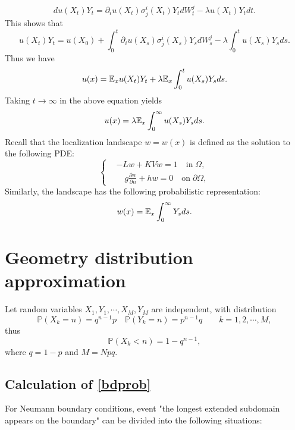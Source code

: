 \documentclass[a4paper,11pt]{article}
\begin{document}
\begin{appendices}
\begin{equation*}
du(X_t) Y_t = \partial_i u(X_t) \sigma^i_j(X_t) Y_t dW^j_t - \lambda u(X_t) Y_tdt.
\end{equation*}
This shows that
\begin{equation*}
u(X_t)Y_t = u(X_0) + \int_0^t \partial_i u(X_s) \sigma^i_j(X_s) Y_s dW^j_s - \lambda \int_0^t u(X_s) Y_s ds.
\end{equation*}
Thus we have
\begin{equation*}
u(x) = \mathbb{E}_xu(X_t)Y_t+\lambda\mathbb{E}_x\int_0^t u(X_s)Y_sds.
\end{equation*}
Taking $t\rightarrow\infty$ in the above equation yields
\begin{equation*}
u(x) = \lambda\mathbb{E}_x\int_0^\infty u(X_s)Y_sds.
\end{equation*}
Recall that the localization landscape $w = w(x)$ is defined as the solution to the following PDE:
\begin{equation*}
\left\{
\begin{split}
& - L w + K V w = 1 \quad \textrm{in} \; \Omega, \\
& \quad g \frac{\partial w}{\partial n} + h w = 0 \quad \textrm{on} \; \partial \Omega,
\end{split}\right.
\end{equation*}
Similarly, the landscape has the following probabilistic representation:
\begin{equation*}
w(x) = \mathbb{E}_x\int_0^\infty Y_sds.
\end{equation*}

\section{Geometry distribution approximation}\label{AppendixB}

Let random variables $X_1, Y_1, \cdots, X_M, Y_M$ are independent, with distribution
$$ \mathbb{P}(X_k = n) = q^{n-1} p \quad \mathbb{P}(Y_k = n) = p^{n-1} q \qquad k = 1, 2, \cdots, M, $$
thus
$$ \mathbb{P}(X_k < n) = 1 - q^{n-1}, $$
where $q = 1 - p$ and $M = N p q$.

\subsection{Calculation of \eqref{bdprob}}\label{AppendixB1}

For Neumann boundary conditions, event "the longest extended subdomain appears on the boundary" can be divided into the following situations:


\end{appendices}
\end{document}
